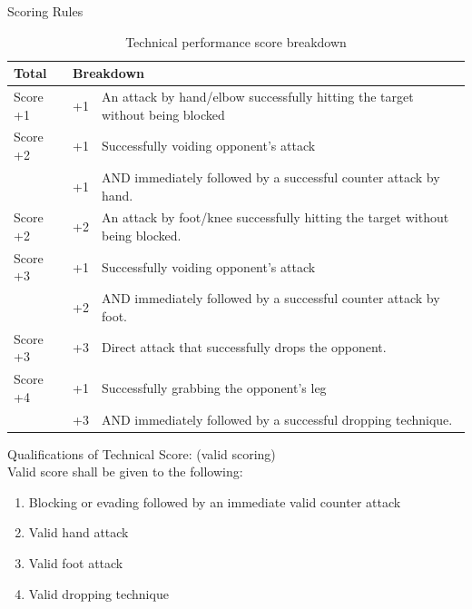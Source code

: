 \begin{legal}
\begin{legal}
            \begin{legal}
            \item Scoring Rules \\
        \begin{table}[h!]
        \centering
        \begin{tabular}{l|ll}
        Total     & \multicolumn{2}{l}{Breakdown} \\
        \hline
        Score +1  & +1  & An attack by hand/elbow successfully hitting the target without being blocked \\
        \hline
        Score +2  & +1  & Successfully voiding opponent’s attack \\
                  & +1  & AND immediately followed by a successful counter attack by hand. \\
        \hline
        Score +2  & +2  & An attack by foot/knee successfully hitting the target without being blocked. \\
        \hline
        Score +3  & +1  & Successfully voiding opponent’s attack \\
                  & +2  & AND immediately followed by a successful counter attack by foot. \\
        \hline
        Score +3  & +3  & Direct attack that successfully drops the opponent. \\
        \hline
        Score +4  & +1  & Successfully grabbing the opponent's leg \\
                  & +3  & AND immediately followed by a successful dropping technique.\\

        \end{tabular}
        \caption{Technical performance score breakdown}
        \label{tbl:tanding_technical_score}
        \end{table}

            \item Qualifications of Technical Score: (valid scoring) \\
                  Valid score shall be given to the following:
                \begin{enumerate}[label=\Alph*.]
                \item Blocking or evading followed by an immediate valid counter attack
                \item Valid hand attack
                \item Valid foot attack
                \item Valid dropping technique
                \end{enumerate}
                

\end{legal}
\end{legal}
\end{legal}
